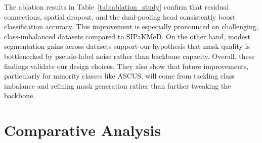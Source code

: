 \documentclass[pdflatex,sn-nature]{sn-jnl}%
\theoremstyle{thmstyleone}%
\theoremstyle{thmstyletwo}%
\theoremstyle{thmstylethree}%
\begin{document}




The ablation results in Table~\ref{tab:ablation_study} confirm that residual connections, spatial dropout, and the dual-pooling head consistently boost classification accuracy. This improvement is especially pronounced on challenging, class-imbalanced datasets compared to SIPaKMeD. On the other hand, modest segmentation gains across datasets support our hypothesis that mask quality is bottlenecked by pseudo-label noise rather than backbone capacity. Overall, these findings validate our design choices. They also show that future improvements, particularly for minority classes like ASCUS, will come from tackling class imbalance and refining mask generation rather than further tweaking the backbone.

\section{Comparative Analysis}
\label{sec:comparative_analysis}
\end{document}

